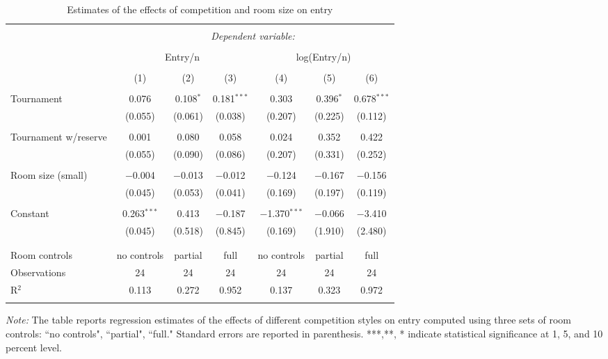 \documentclass[10pt, titlepage]{article}
\begin{document}
\begin{table}
\centering
\caption{Estimates of the effects of competition and room size on entry}\label{ols entry}
\begin{tabular}{@{}lcccccc}
\\[-1.8ex]\hline 
\hline \\[-1.8ex] 
 & \multicolumn{6}{c}{\textit{Dependent variable:}} \\ 
\cline{2-7} 
\\[-1.8ex] & \multicolumn{3}{c}{Entry/n} & \multicolumn{3}{c}{log(Entry/n)} \\ 
\\[-1.8ex] & (1) & (2) & (3) & (4) & (5) & (6)\\ 
\hline \\[-1.8ex] 
 Tournament & 0.076 & 0.108$^{*}$ & 0.181$^{***}$ & 0.303 & 0.396$^{*}$ & 0.678$^{***}$ \\ 
  & (0.055) & (0.061) & (0.038) & (0.207) & (0.225) & (0.112) \\ 
  & & & & & & \\ 
 Tournament w/reserve & 0.001 & 0.080 & 0.058 & 0.024 & 0.352 & 0.422 \\ 
  & (0.055) & (0.090) & (0.086) & (0.207) & (0.331) & (0.252) \\ 
  & & & & & & \\ 
 Room size (small) & $-$0.004 & $-$0.013 & $-$0.012 & $-$0.124 & $-$0.167 & $-$0.156 \\ 
  & (0.045) & (0.053) & (0.041) & (0.169) & (0.197) & (0.119) \\ 
  & & & & & & \\ 
 Constant & 0.263$^{***}$ & 0.413 & $-$0.187 & $-$1.370$^{***}$ & $-$0.066 & $-$3.410 \\ 
  & (0.045) & (0.518) & (0.845) & (0.169) & (1.910) & (2.480) \\ 
  & & & & & & \\ 
\hline \\[-1.8ex] 
Room controls & no controls & partial & full & no controls & partial & full \\ 
Observations & 24 & 24 & 24 & 24 & 24 & 24 \\ 
R$^{2}$ & 0.113 & 0.272 & 0.952 & 0.137 & 0.323 & 0.972 \\ 
\hline 
\hline \\[-1.8ex] 
\end{tabular} 
\begin{minipage}{1.000000\textwidth}
\footnotesize\emph{Note:} The table reports regression estimates of the effects of different competition styles on entry computed using three sets of room controls: ``no controls", ``partial", ``full." Standard errors are reported in parenthesis. ***,**, * indicate statistical significance at 1, 5, and 10 percent level.
\end{minipage}
\end{table}
\end{document}
